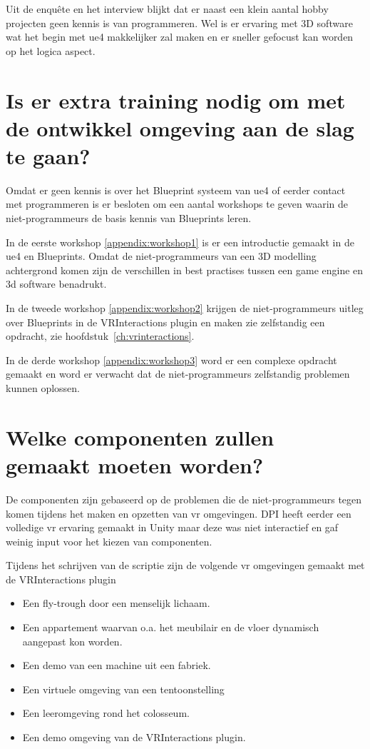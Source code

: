 Uit de enquête en het interview blijkt dat er naast een klein aantal hobby projecten geen kennis is van programmeren. Wel is er ervaring met 3D software wat het begin met \gls{ue4} makkelijker zal maken en er sneller gefocust kan worden op het logica aspect.

\section{Is er extra training nodig om met de ontwikkel omgeving aan de slag te gaan?}
Omdat er geen kennis is over het Blueprint systeem van \gls{ue4} of eerder contact met programmeren is er besloten om een aantal workshops te geven waarin de niet-programmeurs de basis kennis van Blueprints leren.

In de eerste workshop \ref{appendix:workshop1} is er een introductie gemaakt in de \gls{ue4} en Blueprints. Omdat de niet-programmeurs van een 3D modelling achtergrond komen zijn de verschillen in best practises tussen een game engine en 3d software benadrukt.

In de tweede workshop \ref{appendix:workshop2} krijgen de niet-programmeurs uitleg over Blueprints in de VRInteractions plugin en maken zie zelfstandig een opdracht, zie hoofdstuk~\ref{ch:vrinteractions}. 

In de derde workshop \ref{appendix:workshop3} word er een complexe opdracht gemaakt en word er verwacht dat de niet-programmeurs zelfstandig problemen kunnen oplossen.

\section{Welke componenten zullen gemaakt moeten worden?}
De componenten zijn gebaseerd op de problemen die de niet-programmeurs tegen komen tijdens het maken en opzetten van \gls{vr} omgevingen. DPI heeft eerder een volledige \gls{vr} ervaring gemaakt in Unity maar deze was niet interactief en gaf weinig input voor het kiezen van componenten. 

Tijdens het schrijven van de scriptie zijn de volgende \gls{vr} omgevingen gemaakt met de VRInteractions plugin

\begin{itemize}
	\item Een fly-trough door een menselijk lichaam.
	\item Een appartement waarvan o.a. het meubilair en de vloer dynamisch aangepast kon worden.
	\item Een demo van een machine uit een fabriek.
	\item Een virtuele omgeving van een tentoonstelling
	\item Een leeromgeving rond het colosseum.
	\item Een demo omgeving van de VRInteractions plugin.
\end{itemize}

